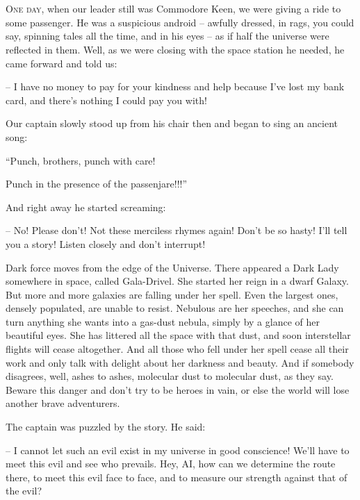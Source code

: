 \documentclass[ebook,twoside,final,openright]{memoir}
\begin{document}
\chapter{}
\par
\lettrine{O}{ne day,} when our leader still was Commodore Keen, we were giving a ride to some passenger. He was a suspicious android – awfully dressed, in rags, you could say, spinning tales all the time, and in his eyes – as if half the universe were reflected in them. Well, as we were closing with the space station he needed, he came forward and told us: \par
\par
– I have no money to pay for your kindness and help because I’ve lost my bank card, and there’s nothing I could pay you with!\par
Our captain slowly stood up from his chair then and began to sing an ancient song: \par
“Punch, brothers, punch with care! \par
 Punch in the presence of the passenjare!!!” \par
And right away he started screaming: \par
 – No! Please don’t! Not these merciless rhymes again! Don’t be so hasty! I'll tell you a story! Listen closely and don’t interrupt!\par
\par
Dark force moves from the edge of the Universe. There appeared a Dark Lady somewhere in space, called Gala-Drivel. She started her reign in a dwarf Galaxy. But more and more galaxies are falling under her spell. Even the largest ones, densely populated, are unable to resist. Nebulous are her speeches, and she can turn anything she wants into a gas-dust nebula, simply by a glance of her beautiful eyes. She has littered all the space with that dust, and soon interstellar flights will cease altogether. And all those who fell under her spell cease all their work and only talk with delight about her darkness and beauty. And if somebody disagrees, well, ashes to ashes, molecular dust to molecular dust, as they say. Beware this danger and don’t try to be heroes in vain, or else the world will lose another brave adventurers.\par
\par
The captain was puzzled by the story. He said:\par
– I cannot let such an evil exist in my universe in good conscience! We'll have to meet this evil and see who prevails. Hey, AI, how can we determine the route there, to meet this evil face to face, and to measure our strength against that of the evil?\par
\end{document}
